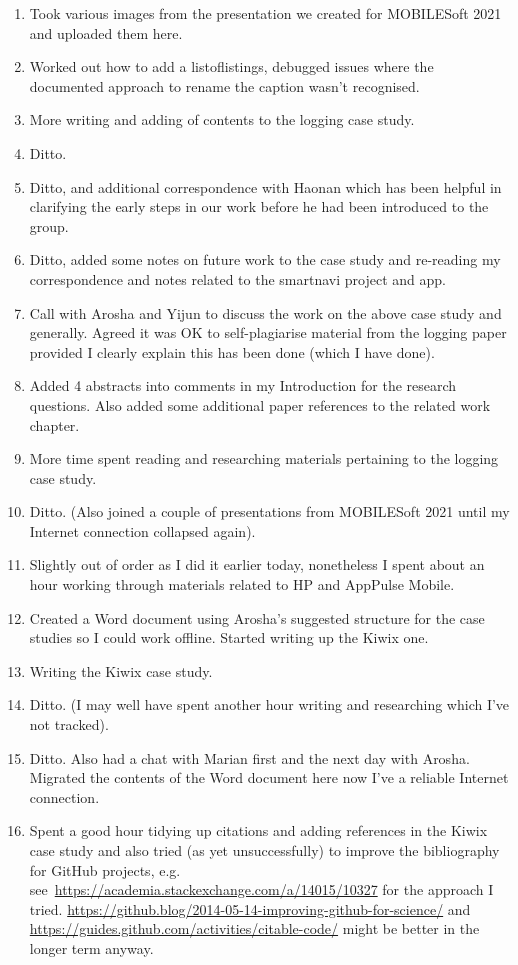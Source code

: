 \begin{enumerate}
    \item Took various images from the presentation we created for MOBILESoft 2021 and uploaded them here.
    \item Worked out how to add a listoflistings, debugged issues where the documented approach to rename the caption wasn't recognised.
    \item More writing and adding of contents to the logging case study.
    \item Ditto.
    \item Ditto, and additional correspondence with Haonan which has been helpful in clarifying the early steps in our work before he had been introduced to the group.
    \item Ditto, added some notes on future work to the case study and re-reading my correspondence and notes related to the smartnavi project and app.
    \item Call with Arosha and Yijun to discuss the work on the above case study and generally. Agreed it was OK to self-plagiarise material from the logging paper provided I clearly explain this has been done (which I have done).
    \item Added 4 abstracts into comments in my Introduction for the research questions. Also added some additional paper references to the related work chapter.
    \item More time spent reading and researching materials pertaining to the logging case study. 
    \item Ditto. (Also joined a couple of presentations from MOBILESoft 2021 until my Internet connection collapsed again).
    \item Slightly out of order as I did it earlier today, nonetheless I spent about an hour working through materials related to HP and AppPulse Mobile.
    \item Created a Word document using Arosha's suggested structure for the case studies so I could work offline. Started writing up the Kiwix one.
    \item Writing the Kiwix case study.
    \item Ditto. (I may well have spent another hour writing and researching which I've not tracked).
    \item Ditto. Also had a chat with Marian first and the next day with Arosha. Migrated the contents of the Word document here now I've a reliable Internet connection.
    \item Spent a good hour tidying up citations and adding references in the Kiwix case study and also tried (as yet unsuccessfully) to improve the bibliography for GitHub projects, e.g. see~\url{https://academia.stackexchange.com/a/14015/10327} for the approach I tried. \url{https://github.blog/2014-05-14-improving-github-for-science/} and \url{https://guides.github.com/activities/citable-code/} might be better in the longer term anyway.

\end{enumerate}
